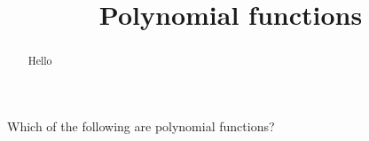\documentclass{ximera}
\title[Dig-In:]{Polynomial functions}
\begin{document}
\begin{abstract}
  Hello
\end{abstract}
\maketitle


\begin{definition}
\end{definition}

\begin{question}
  Which of the following are polynomial functions?
  \begin{multipleChoice}
  \end{multipleChoice}
\end{question}
\end{document}
